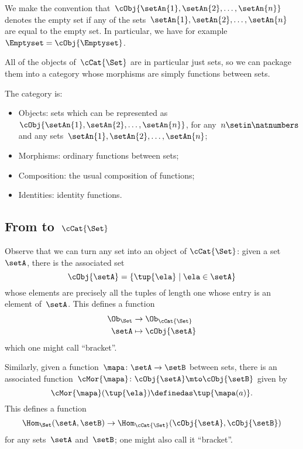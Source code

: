 We make the convention that~$\cObj{\setAn{1}, \setAn{2}, \ldots, \setAn{n}}$ denotes the empty set if any of the sets~$\setAn{1}, \setAn{2}, \ldots , \setAn{n}$ are equal to the empty set.
In particular, we have for example~$\Emptyset = \cObj{\Emptyset}$.

All of the objects of~$\cCat{\Set}$ are in particular just sets, so we can package them into a category whose morphisms are simply functions between sets.

\begin{ctdefinition}[\cCat{\Set}]
    The category \cCat{\Set} is:
    \begin{itemize}
        \item Objects: sets which can be represented as~$\cObj{\setAn{1}, \setAn{2}, \ldots, \setAn{n}}$, for any~$n \setin \natnumbers$ and any sets~$\setAn{1}, \setAn{2}, \ldots, \setAn{n}$;
        \item Morphisms: ordinary functions between sets;
        \item Composition: the usual composition of functions;
        \item Identities: identity functions.
    \end{itemize}
\end{ctdefinition}

\subsection{From \Set to~$\cCat{\Set}$}

Observe that we can turn any set into an object of $\cCat{\Set}$: given a set~$\setA$, there is the associated set
\begin{equation*}
    \cObj{\setA} = \{ \tup{\ela} \mid \ela \in \setA \}
\end{equation*}
whose elements are precisely all the tuples of length one whose entry is an element of~$\setA$.
This defines a function
\begin{equation*}
    \begin{aligned}
        \Ob_{\Set} & \to \Ob_{\cCat{\Set}} \\
        \setA      & \mapsto \cObj{\setA}
    \end{aligned}
\end{equation*}
which one might call ``bracket''.

Similarly, given a function~$\mapa \colon \setA \to \setB$ between sets, there is an associated function~$\cMor{ \mapa }\colon \cObj{\setA} \mto \cObj{\setB}$ given by
\begin{equation*}
    \cMor{ \mapa } ( \tup{ \ela }) \definedas \tup{\mapa(a)}.
\end{equation*}
This defines a function
\begin{equation*}
    \Hom_{\Set}(\setA,\setB) \to \Hom_{\cCat{\Set}}(\cObj{\setA},\cObj{\setB})
\end{equation*}
for any sets~$\setA$ and~$\setB$; one might also call it ``bracket''.

